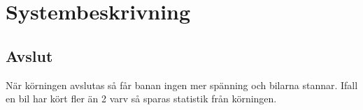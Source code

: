 \section{Systembeskrivning}






\subsection{Avslut}

När körningen avslutas så får banan ingen mer spänning och bilarna stannar.
Ifall en bil har kört fler än 2 varv så sparas statistik från körningen. 
